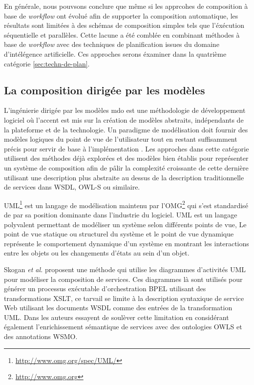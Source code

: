     En générale, nous pouvsons conclure que même si les apprcohes de
    composition à base de \textit{workflow} ont évolué afin de
    supporter la composition automatique, les résultats sont limitées
    à des schémas de composition simples tels que l'éxécution
    séquentielle et parallèles. Cette lacune a été comblée en
    combinant méthodes à base de \textit{workflow} avec des techniques
    de planification issues du domaine d'intélégence artificielle. Ces
    approches serons éxaminer dans la quatrième catégorie
    \ref{sec:techn-de-plan}.

    \subsection{La composition dirigée par les modèles}
    \label{sec:model-based-composition}

    L'ingénierie dirigée par les modèles \acrshort{mdo} est une
    méthodologie de développement logiciel où l'accent est mis sur la
    création de modèles abstraits, indépendants de la plateforme et de
    la technologie. Un paradigme de modélisation doit fournir des
    modèles logiques du point de vue de l'utilisateur tout en restant
    suffisamment précis pour servir de base à l'implémentation
    \cite{dumez2010approche}. Les approches dans cette catégorie
    utilisent des méthodes déjà explorées et des modèles bien établis
    pour représenter un système de composition afin de pâlir la
    complexité croissante de cette dernière utilisant une description
    plus abstraite au dessus de la description traditionnelle de
    services dans \textsc{WSDL}, \textsc{OWL-S} ou similaire.

    \textsc{UML}\footnote{\url{http://www.omg.org/spec/UML/}}
    \cite{rumbaugh2004unified} est un langage de modélisation maintenu
    par l'\textsc{OMG}\footnote{\url{http://www.omg.org}} qui s'est
    standardisé de par sa position dominante dans l'industrie du
    logiciel. \textsc{UML} est un langage polyvalent permettant de
    modéliser un système selon différents points de vue, Le point de
    vue statique ou structurel du système et le point de vue dynamique
    représente le comportement dynamique d'un système en montrant les
    interactions entre les objets ou les changements d'états au sein
    d'un objet.

    Skogan \textit{et al.}  \cite{skogan2004web} proposent une méthode
    qui utilise les diagrammes d'activités \textsc{UML} pour modéliser
    la composition de services. Ces diagrammes là sont utilisés pour
    générer un processus exécutable d'orchestration \textsc{BPEL}
    utilisant des transformations \textsc{XSLT}, ce tarvail se limite
    à la description syntaxique de service Web utilisant les documents
    \textsc{WSDL} comme des entrées de la transformation
    \textsc{UML}. Dans \cite{gronmo2005model} les auteurs essayent de
    soulèver cette limitation en considérant également
    l'enrichissement sémantique de services avec des ontologies
    \textsc{OWLS} et des annotations \textsc{WSMO}.

